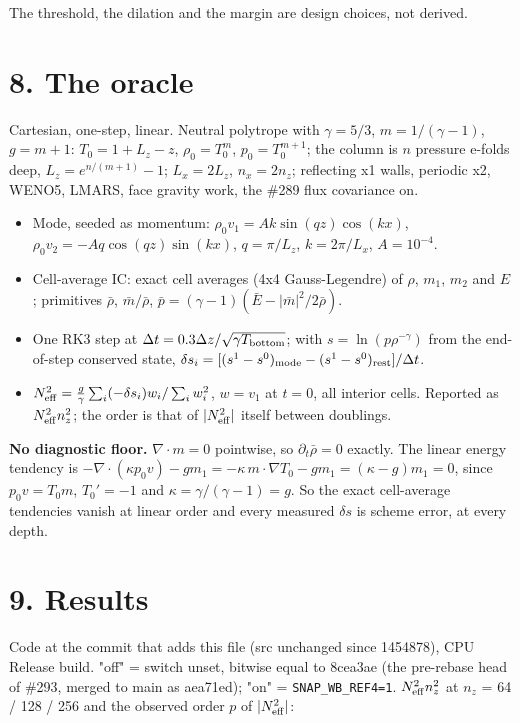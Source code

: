 \documentclass[11pt,a4paper]{article}
\begin{document}
The threshold, the dilation and the margin are design choices, not derived.

\section*{8. The oracle}

Cartesian, one-step, linear. Neutral polytrope with $\gamma = 5/3$, $m = 1/(\gamma-1)$, $g = m+1$:
$T_0 = 1 + L_z - z$, $\rho_0 = T_0^m$, $p_0 = T_0^{m+1}$; the column is $n$ pressure e-folds deep,
$L_z = e^{n/(m+1)} - 1$; $L_x = 2L_z$, $n_x = 2n_z$; reflecting x1 walls, periodic x2, WENO5, LMARS, face
gravity work, the \#289 flux covariance on.

\begin{itemize}
\item Mode, seeded as momentum: $\rho_0 v_1 = Ak\sin(qz)\cos(kx)$, $\rho_0 v_2 = -Aq\cos(qz)\sin(kx)$,
  $q = \pi/L_z$, $k = 2\pi/L_x$, $A = 10^{-4}$.
\item Cell-average IC: exact cell averages (4x4 Gauss-Legendre) of $\rho$, $m_1$, $m_2$ and $E$; primitives
  $\bar\rho$, $\bar m/\bar\rho$, $\bar p = (\gamma-1)(\bar E - \lvert\bar m\rvert^2/2\bar\rho)$.
\item One RK3 step at $\Delta t = 0.3\Delta z/\sqrt{\gamma T_{\rm bottom}}$; with $s = \ln(p\rho^{-\gamma})$ from the
  end-of-step conserved state, $\delta s_i = [(s^1 - s^0)_{\rm mode} - (s^1 - s^0)_{\rm rest}]/\Delta t$.
\item $N^2_{\rm eff} = \tfrac g\gamma \sum_i(-\delta s_i)w_i / \sum_i w_i^2$, $w = v_1$ at $t = 0$, all interior cells.
  Reported as $N^2_{\rm eff}n_z^2$; the order is that of $\lvert N^2_{\rm eff}\rvert$ itself between doublings.
\end{itemize}

\textbf{No diagnostic floor.} $\nabla\cdot m = 0$ pointwise, so $\partial_t\bar\rho = 0$ exactly. The linear energy
tendency is $-\nabla\cdot(\kappa p_0 v) - g m_1 = -\kappa\, m\cdot\nabla T_0 - g m_1 = (\kappa - g)m_1 = 0$, since
$p_0v = T_0 m$, $T_0' = -1$ and $\kappa = \gamma/(\gamma-1) = g$. So the exact cell-average tendencies vanish at
linear order and every measured $\delta s$ is scheme error, at every depth.

\section*{9. Results}

Code at the commit that adds this file (src unchanged since 1454878), CPU Release build. "off" = switch
unset, bitwise equal to 8cea3ae (the pre-rebase head of \#293, merged to main as aea71ed); "on" = \texttt{SNAP\_WB\_REF4=1}. $N^2_{\rm eff}n_z^2$ at $n_z$ = 64 / 128 / 256 and the
observed order $p$ of $\lvert N^2_{\rm eff}\rvert$:
\end{document}
